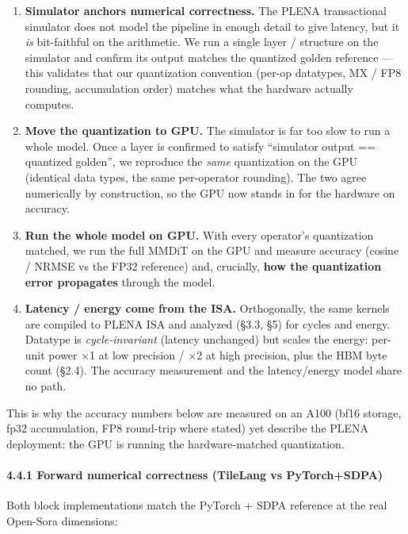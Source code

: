 \documentclass[
  10pt,
]{article}
\providecommand{\tightlist}{%
  \setlength{\itemsep}{0pt}\setlength{\parskip}{0pt}}
\begin{document}
\begin{enumerate}
\def\labelenumi{\arabic{enumi}.}
\tightlist
\item
  \textbf{Simulator anchors numerical correctness.} The PLENA transactional
  simulator does not model the pipeline in enough detail to give latency,
  but it \emph{is} bit-faithful on the arithmetic. We run a single layer /
  structure on the simulator and confirm its output matches the
  quantized golden reference --- this validates that our quantization
  convention (per-op datatypes, MX / FP8 rounding, accumulation order)
  matches what the hardware actually computes.
\item
  \textbf{Move the quantization to GPU.} The simulator is far too slow to
  run a whole model. Once a layer is confirmed to satisfy
  ``simulator output == quantized golden'', we reproduce the \emph{same}
  quantization on the GPU (identical data types, the same per-operator
  rounding). The two agree numerically by construction, so the GPU now
  stands in for the hardware on accuracy.
\item
  \textbf{Run the whole model on GPU.} With every operator's quantization
  matched, we run the full MMDiT on the GPU and measure accuracy (cosine /
  NRMSE vs the FP32 reference) and, crucially, \textbf{how the
  quantization error propagates} through the model.
\item
  \textbf{Latency / energy come from the ISA.} Orthogonally, the same
  kernels are compiled to PLENA ISA and analyzed (§3.3, §5) for cycles and
  energy. Datatype is \emph{cycle-invariant} (latency unchanged) but
  scales the energy: per-unit power ×1 at low precision / ×2 at high
  precision, plus the HBM byte count (§2.4). The accuracy measurement and
  the latency/energy model share no path.
\end{enumerate}

This is why the accuracy numbers below are measured on an A100 (bf16
storage, fp32 accumulation, FP8 round-trip where stated) yet describe the
PLENA deployment: the GPU is running the hardware-matched quantization.

\paragraph{4.4.1 Forward numerical correctness (TileLang vs
PyTorch+SDPA)}\label{fwd-numeric}

Both block implementations match the PyTorch + SDPA reference at the real
Open-Sora dimensions:
\end{document}

